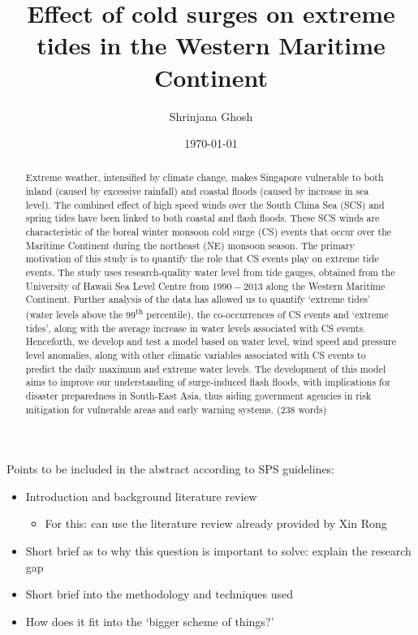 \documentclass[12pt]{article}
\begin{document}
\title{\vspace{-2.0cm}Effect of cold surges on extreme tides in the Western Maritime Continent}
\author{Shrinjana Ghosh}
\date{\today}
\vfill





\maketitle

\begin{abstract}
    Extreme weather, intensified by climate change, makes Singapore vulnerable to both inland (caused by excessive rainfall) and coastal floods
    (caused by increase in sea level). The combined effect of high speed winds over the South China Sea (SCS) and spring tides have been linked to 
    both coastal and flash floods. These SCS winds are characteristic of the boreal winter monsoon cold surge (CS) events that 
    occur over the Maritime Continent during the northeast (NE) monsoon season. The primary motivation of this study is to quantify the role that CS events
    play on extreme tide events. The study uses research-quality water level from tide gauges, obtained from
    the University of Hawaii Sea Level Centre from $1990-2013$ along the 
    Western Maritime Continent. Further analysis of the data has allowed us to quantify `extreme tides' (water levels above the 99\textsuperscript{th} percentile), 
    the co-occurrences of CS events and `extreme tides', along with the
    average increase in water levels associated with CS events. Henceforth, we develop and test a model based on
    water level, wind speed and pressure level anomalies, along with other climatic variables associated with CS events to predict the daily maximum and extreme water levels. 
    The development of this model aims to improve our understanding of surge-induced flash floods, with implications for disaster preparedness in South-East Asia, thus aiding
    government agencies in risk mitigation for vulnerable areas and early warning systems.
    \newline (238 words)
\end{abstract}



\begin{paragraph}
    \noindent Points to be included in the abstract according to SPS guidelines: 
\begin{itemize}
    \item Introduction and background literature review
    \begin{itemize}
        \item For this: can use the literature review already provided by Xin Rong
    \end{itemize}
    \item Short brief as to why this question is important to solve: explain the research gap 
    \item Short brief into the methodology and techniques used 
    \item How does it fit into the `bigger scheme of things?'
\end{itemize}
\end{paragraph} 
\end{document}
